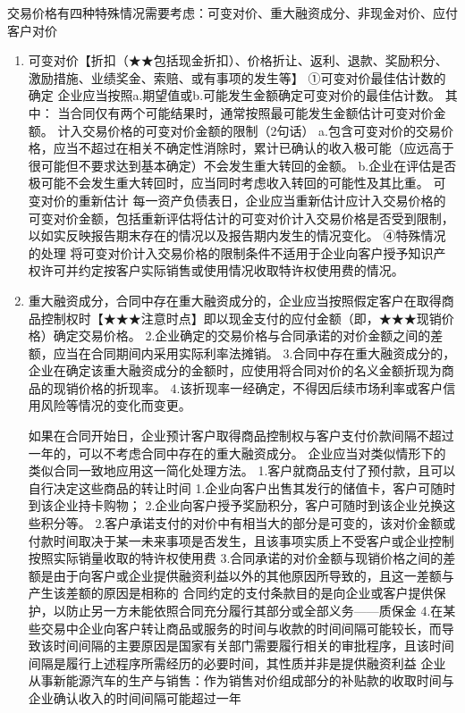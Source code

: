 \documentclass[UTF8,12pt]{ctexart}
\numberwithin{equation}{section} %
\numberwithin{figure}{section}
\numberwithin{table}{section}
\begin{document}
	交易价格有四种特殊情况需要考虑：可变对价、重大融资成分、非现金对价、应付客户对价
	\begin{enumerate}
		\item 可变对价【折扣（★★包括现金折扣）、价格折让、返利、退款、奖励积分、激励措施、业绩奖金、索赔、或有事项的发生等】
		①可变对价最佳估计数的确定
		企业应当按照a.期望值或b.可能发生金额确定可变对价的最佳估计数。
		其中：
		当合同仅有两个可能结果时，通常按照最可能发生金额估计可变对价金额。
		计入交易价格的可变对价金额的限制（2句话）
		a.包含可变对价的交易价格，应当不超过在相关不确定性消除时，累计已确认的收入极可能（应远高于很可能但不要求达到基本确定）不会发生重大转回的金额。
		b.企业在评估是否极可能不会发生重大转回时，应当同时考虑收入转回的可能性及其比重。
		可变对价的重新估计
		每一资产负债表日，企业应当重新估计应计入交易价格的可变对价金额，包括重新评估将估计的可变对价计入交易价格是否受到限制，以如实反映报告期末存在的情况以及报告期内发生的情况变化。
		④特殊情况的处理
		将可变对价计入交易价格的限制条件不适用于企业向客户授予知识产权许可并约定按客户实际销售或使用情况收取特许权使用费的情况。
		
		
		\item 重大融资成分，合同中存在重大融资成分的，企业应当按照假定客户在取得商品控制权时【★★★注意时点】即以现金支付的应付金额（即，★★★现销价格）确定交易价格。
		2.企业确定的交易价格与合同承诺的对价金额之间的差额，应当在合同期间内采用实际利率法摊销。
		3.合同中存在重大融资成分的，企业在确定该重大融资成分的金额时，应使用将合同对价的名义金额折现为商品的现销价格的折现率。
		4.该折现率一经确定，不得因后续市场利率或客户信用风险等情况的变化而变更。
		
		如果在合同开始日，企业预计客户取得商品控制权与客户支付价款间隔不超过一年的，可以不考虑合同中存在的重大融资成分。
		企业应当对类似情形下的类似合同一致地应用这一简化处理方法。
		1.客户就商品支付了预付款，且可以自行决定这些商品的转让时间	1.企业向客户出售其发行的储值卡，客户可随时到该企业持卡购物；
		2.企业向客户授予奖励积分，客户可随时到该企业兑换这些积分等。
		2.客户承诺支付的对价中有相当大的部分是可变的，该对价金额或付款时间取决于某一未来事项是否发生，且该事项实质上不受客户或企业控制	按照实际销量收取的特许权使用费
		3.合同承诺的对价金额与现销价格之间的差额是由于向客户或企业提供融资利益以外的其他原因所导致的，且这一差额与产生该差额的原因是相称的	合同约定的支付条款目的是向企业或客户提供保护，以防止另一方未能依照合同充分履行其部分或全部义务——质保金
		4.在某些交易中企业向客户转让商品或服务的时间与收款的时间间隔可能较长，而导致该时间间隔的主要原因是国家有关部门需要履行相关的审批程序，且该时间间隔是履行上述程序所需经历的必要时间，其性质并非是提供融资利益	企业从事新能源汽车的生产与销售：作为销售对价组成部分的补贴款的收取时间与企业确认收入的时间间隔可能超过一年
		

\end{enumerate}
\end{document}
